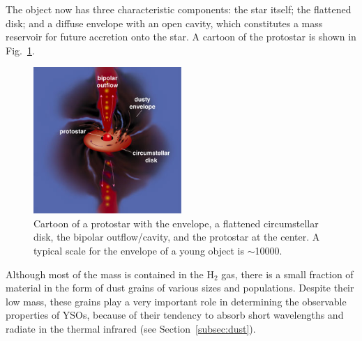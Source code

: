The object now has three characteristic components: the star itself; the flattened disk; and a diffuse envelope with an open cavity, which constitutes a mass reservoir for future accretion onto the star. A cartoon of the protostar is shown in Fig.~\ref{fig:Protostar}.

\begin{figure}[!ht]
	\centering
	\includegraphics[width=0.5\textwidth]{Figures/protostar.jpg} 
	\caption[Protostar]{Cartoon of a protostar \citep{Greene:2001dg} with the envelope, a flattened circumstellar disk, the bipolar outflow/cavity, and the protostar at the center. A typical scale for the envelope of a young object is $\sim$\SI{10000}{\au}.}
	\label{fig:Protostar}
    \end{figure}



Although most of the mass is contained in the $\textrm{H}_2$ gas, there is a small fraction of material in the form of dust grains of various sizes and populations. Despite their low mass, these grains play a very important role in determining the observable properties of YSOs, because of their tendency to absorb short wavelengths and radiate in the thermal infrared (see Section~\ref{subsec:dust}). 

